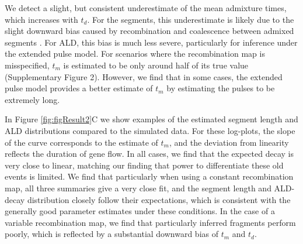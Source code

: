 \documentclass[11pt]{article}
\begin{document}
We detect a slight, but consistent underestimate of the mean admixture times, which increases with $t_d$. For the segments, this underestimate is likely due to the slight downward bias caused by recombination and coalescence between admixed segments \citep[][see also Appendix ]{liang_lengths_2014}. For ALD, this bias is much less severe, particularly for inference under the extended pulse model. For scenarios where the recombination map is misspecified,  $t_m$ is estimated to be only around half of its true value (Supplementary Figure 2). However, we find that in some cases, the extended pulse model provides a better estimate of $t_m$ by estimating the pulses to be extremely long.

In Figure \ref{fig:figResult2}C we show examples of the estimated segment length and ALD distributions compared to the simulated data. For these log-plots, the slope of the curve corresponds to the estimate of $t_m$, and the deviation from linearity reflects the duration of gene flow. In all cases, we find that the expected decay is very close to linear, matching our finding that power to differentiate these old events is limited. We find that particularly when using a constant recombination map, all three summaries give a very close fit, and the segment length and ALD-decay distribution  closely follow their expectations, which is consistent with the generally  good parameter estimates under these conditions. In the case of a variable recombination map, we find that particularly inferred fragments perform poorly, which is reflected by a substantial downward bias of $t_m$ and $t_d$.
\end{document}

